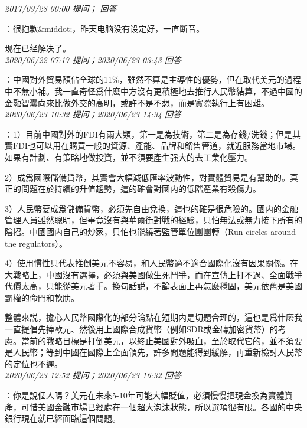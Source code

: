 \documentclass[twocolumn]{ctexart}
\begin{document}
\textit{\hfill\noindent\small 2017/09/28 00:00 提问； 回答}

：很抱歉\&middot;，昨天电脑没有设定好，一直断音。

现在已经解决了。\\

\textit{\hfill\noindent\small 2020/06/22 07:17 提问；2020/06/23 03:43 回答}

：中國對外貿易額佔全球的11\%，雖然不算是主導性的優勢，但在取代美元的過程中不無小補。我一直奇怪爲什麽中方沒有更積極地去推行人民幣結算，不過中國的金融智囊向來比做外交的高明，或許不是不想，而是實際執行上有困難。
\\

\textit{\hfill\noindent\small 2020/06/23 10:32 提问；2020/06/23 14:34 回答}

：1）目前中國對外的FDI有兩大類，第一是為技術，第二是為存錢/洗錢；但是其實FDI也可以用在購買一般的資源、產能、品牌和銷售管道，就近服務當地市場。如果有計劃、有策略地做投資，並不須要產生强大的去工業化壓力。

2）成爲國際儲備貨幣，其實會大幅減低匯率波動性，對實體貿易是有幫助的。真正的問題在於持續的升值趨勢，這的確會對國内的低階產業有殺傷力。

3）人民幣要成爲儲備貨幣，必須先自由兌換，這也的確是很危險的。國内的金融管理人員雖然聰明，但畢竟沒有與華爾街對戰的經驗，只怕無法或無力接下所有的陰招。中國國内自己的炒家，只怕也能繞著監管單位團團轉（Run circles around the regulators）。

4）使用慣性只代表推倒美元不容易，和人民幣適不適合國際化沒有因果關係。在大戰略上，中國沒有選擇，必須與美國做生死鬥爭，而在宣傳上打不過、全面戰爭代價太高，只能從美元著手。換句話説，不論表面上再怎麽穩固，美元依舊是美國霸權的命門和軟肋。

整體來説，擔心人民幣國際化的部分論點在短期内是切題合理的，這也是爲什麽我一直提倡先捧歐元、然後用上國際合成貨幣（例如SDR或金磚加密貨幣）的考慮。當前的戰略目標是打倒美元，以終止美國對外吸血，至於取代它的，並不須要是人民幣；等到中國在國際上全面領先，許多問題能得到緩解，再重新檢討人民幣的定位也不遲。
\\

\textit{\hfill\noindent\small 2020/06/23 12:52 提问；2020/06/23 16:32 回答}

：你是說個人嗎？美元在未來5-10年可能大幅貶值，必須慢慢把現金換為實體資產，可惜美國金融市場已經處在一個超大泡沫狀態，所以選項很有限。各國的中央銀行現在就已經面臨這個問題。
\\
\end{document}
